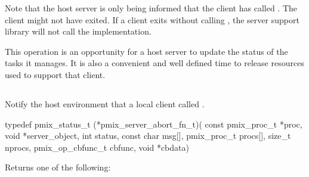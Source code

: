 Note that the host server is only being informed that the client has called .  The client might not have exited.  If a client
exits without calling , the server support library will not call the  implementation.

\advicermstart
This operation is an opportunity for a host server
to update the status of the tasks it manages.  It is also a convenient and well defined time to release resources used to support that client.
\advicermend


\subsection{}

\summary

Notify the host environment that a local client called .

\format

\cspecificstart
\begin{codepar}
typedef pmix_status_t (*pmix_server_abort_fn_t)(
                             const pmix_proc_t *proc,
                             void *server_object,
                             int status,
                             const char msg[],
                             pmix_proc_t procs[],
                             size_t nprocs,
                             pmix_op_cbfunc_t cbfunc,
                             void *cbdata)
\end{codepar}
\cspecificend


\begin{arglist}
\end{arglist}

Returns one of the following:

